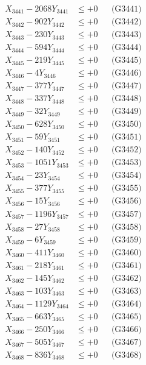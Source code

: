 \documentclass[a4paper,10pt]{article}
\begin{document}
{\begin{align}
\allowbreak
X_{3441} - 2068Y_{3441} &\leq +0 && \text{(G3441)} \\
X_{3442} - 902Y_{3442} &\leq +0 && \text{(G3442)} \\
X_{3443} - 230Y_{3443} &\leq +0 && \text{(G3443)} \\
X_{3444} - 594Y_{3444} &\leq +0 && \text{(G3444)} \\
X_{3445} - 219Y_{3445} &\leq +0 && \text{(G3445)} \\
X_{3446} - 4Y_{3446} &\leq +0 && \text{(G3446)} \\
X_{3447} - 377Y_{3447} &\leq +0 && \text{(G3447)} \\
X_{3448} - 337Y_{3448} &\leq +0 && \text{(G3448)} \\
X_{3449} - 32Y_{3449} &\leq +0 && \text{(G3449)} \\
X_{3450} - 628Y_{3450} &\leq +0 && \text{(G3450)} \\
\allowbreak
X_{3451} - 59Y_{3451} &\leq +0 && \text{(G3451)} \\
X_{3452} - 140Y_{3452} &\leq +0 && \text{(G3452)} \\
X_{3453} - 1051Y_{3453} &\leq +0 && \text{(G3453)} \\
X_{3454} - 23Y_{3454} &\leq +0 && \text{(G3454)} \\
X_{3455} - 377Y_{3455} &\leq +0 && \text{(G3455)} \\
X_{3456} - 15Y_{3456} &\leq +0 && \text{(G3456)} \\
X_{3457} - 1196Y_{3457} &\leq +0 && \text{(G3457)} \\
X_{3458} - 27Y_{3458} &\leq +0 && \text{(G3458)} \\
X_{3459} - 6Y_{3459} &\leq +0 && \text{(G3459)} \\
X_{3460} - 411Y_{3460} &\leq +0 && \text{(G3460)} \\
\allowbreak
X_{3461} - 218Y_{3461} &\leq +0 && \text{(G3461)} \\
X_{3462} - 145Y_{3462} &\leq +0 && \text{(G3462)} \\
X_{3463} - 103Y_{3463} &\leq +0 && \text{(G3463)} \\
X_{3464} - 1129Y_{3464} &\leq +0 && \text{(G3464)} \\
X_{3465} - 663Y_{3465} &\leq +0 && \text{(G3465)} \\
X_{3466} - 250Y_{3466} &\leq +0 && \text{(G3466)} \\
X_{3467} - 505Y_{3467} &\leq +0 && \text{(G3467)} \\
X_{3468} - 836Y_{3468} &\leq +0 && \text{(G3468)} \\

\end{align}}
\end{document}
